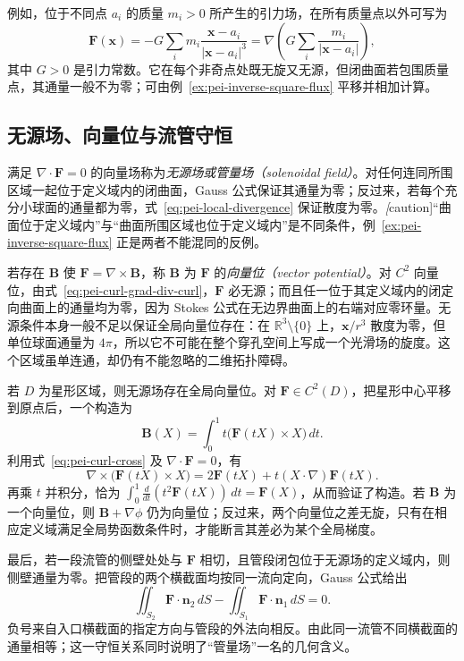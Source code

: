 例如，位于不同点 $a_i$ 的质量 $m_i>0$ 所产生的引力场，在所有质量点以外可写为
\[
\boldsymbol F(\boldsymbol x)
=-G\sum_i m_i\frac{\boldsymbol x-a_i}{|\boldsymbol x-a_i|^3}
=\nabla\left(G\sum_i\frac{m_i}{|\boldsymbol x-a_i|}\right),
\]
其中 $G>0$ 是引力常数。它在每个非奇点处既无旋又无源，但闭曲面若包围质量点，其通量一般不为零；可由例~\ref{ex:pei-inverse-square-flux} 平移并相加计算。

\subsection{无源场、向量位与流管守恒}

满足 $\nabla\cdot\boldsymbol F=0$ 的向量场称为\emph{无源场或管量场（solenoidal field）}。对任何连同所围区域一起位于定义域内的闭曲面，Gauss 公式保证其通量为零；反过来，若每个充分小球面的通量都为零，式~\eqref{eq:pei-local-divergence} 保证散度为零。\emph[caution]{“曲面位于定义域内”与“曲面所围区域也位于定义域内”是不同条件}，例~\ref{ex:pei-inverse-square-flux} 正是两者不能混同的反例。

若存在 $\boldsymbol B$ 使 $\boldsymbol F=\nabla\times\boldsymbol B$，称 $\boldsymbol B$ 为 $\boldsymbol F$ 的\emph{向量位（vector potential）}。对 $C^2$ 向量位，由式~\eqref{eq:pei-curl-grad-div-curl}，$\boldsymbol F$ 必无源；而且任一位于其定义域内的闭定向曲面上的通量均为零，因为 Stokes 公式在无边界曲面上的右端对应零环量。无源条件本身一般不足以保证全局向量位存在：在 $\mathbb R^3\setminus\{0\}$ 上，$\boldsymbol x/r^3$ 散度为零，但单位球面通量为 $4\pi$，所以它不可能在整个穿孔空间上写成一个光滑场的旋度。这个区域虽单连通，却仍有不能忽略的二维拓扑障碍。

若 $D$ 为星形区域，则无源场存在全局向量位。对 $\boldsymbol F\in C^2(D)$，把星形中心平移到原点后，一个构造为
\begin{equation}
\label{eq:pei-star-shaped-vector-potential}
\boldsymbol B(X)=\int_0^1t\bigl(\boldsymbol F(tX)\times X\bigr)\,dt.
\end{equation}
利用式~\eqref{eq:pei-curl-cross} 及 $\nabla\cdot\boldsymbol F=0$，有
\[
\nabla\times\bigl(\boldsymbol F(tX)\times X\bigr)
=2\boldsymbol F(tX)+t(X\cdot\nabla)\boldsymbol F(tX).
\]
再乘 $t$ 并积分，恰为 $\int_0^1\frac d{dt}(t^2\boldsymbol F(tX))\,dt=\boldsymbol F(X)$，从而验证了构造。若 $\boldsymbol B$ 为一个向量位，则 $\boldsymbol B+\nabla\phi$ 仍为向量位；反过来，两个向量位之差无旋，只有在相应定义域满足全局势函数条件时，才能断言其差必为某个全局梯度。

最后，若一段流管的侧壁处处与 $\boldsymbol F$ 相切，且管段闭包位于无源场的定义域内，则侧壁通量为零。把管段的两个横截面均按同一流向定向，Gauss 公式给出
\[
\iint_{S_2}\boldsymbol F\cdot\boldsymbol n_2\,dS
-\iint_{S_1}\boldsymbol F\cdot\boldsymbol n_1\,dS=0.
\]
负号来自入口横截面的指定方向与管段的外法向相反。由此同一流管不同横截面的通量相等；这一守恒关系同时说明了“管量场”一名的几何含义。




